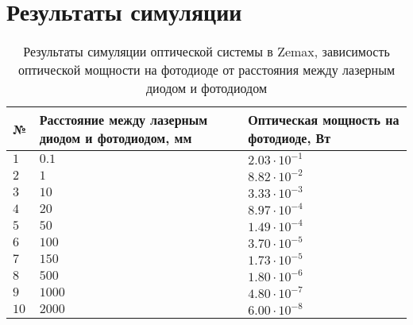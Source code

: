 \chapter{Результаты симуляции}
\label{ch:simulation_results}

\begin{table}
    \caption{Результаты симуляции оптической системы в Zemax, зависимость оптической мощности на фотодиоде от расстояния между лазерным диодом и фотодиодом}
    \label{tab:distance_simulation}
    \begin{tabularx}{\textwidth} {
        | l
        | >{\centering\arraybackslash}X
        | >{\centering\arraybackslash}X | }
        \hline
            № & Расстояние между лазерным диодом и фотодиодом, мм & Оптическая мощность на фотодиоде, Вт \\ \hline
            $1$ & $0.1$ & $2.03 \cdot 10^{-1}$ \\ \hline
            $2$ & $1$ & $8.82 \cdot 10^{-2}$ \\ \hline
            $3$ & $10$ & $3.33 \cdot 10^{-3}$ \\ \hline
            $4$ & $20$ & $8.97 \cdot 10^{-4}$ \\ \hline
            $5$ & $50$ & $1.49 \cdot 10^{-4}$ \\ \hline
            $6$ & $100$ & $3.70 \cdot 10^{-5}$ \\ \hline
            $7$ & $150$ & $1.73 \cdot 10^{-5}$ \\ \hline
            $8$ & $500$ & $1.80 \cdot 10^{-6}$ \\ \hline
            $9$ & $1000$ & $4.80 \cdot 10^{-7}$ \\ \hline
            $10$ & $2000$ & $6.00 \cdot 10^{-8}$ \\ \hline                    
    \end{tabularx}
\end{table}

